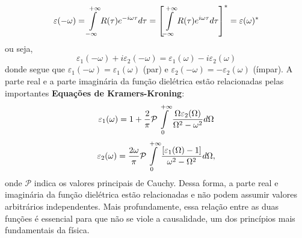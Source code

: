 \documentclass{article}
\begin{document}
\begin{equation}
    \varepsilon(-\omega) = \int\displaylimits_{-\infty}^{+\infty} R(\tau)e^{-i\omega \tau}d\tau = \left[ \int\displaylimits_{-\infty}^{+\infty} R(\tau)e^{i\omega \tau}d\tau \right]^{*} = \varepsilon(\omega)^{*}
\end{equation}
ou seja,
\begin{equation}
    \varepsilon_1(-\omega) + i\varepsilon_2 (-\omega) = \varepsilon_1(\omega) - i\varepsilon_2 (\omega)
\end{equation}
donde segue que $\varepsilon_1(-\omega) = \varepsilon_1(\omega)$ (par) e $\varepsilon_2(-\omega) = -\varepsilon_2(\omega)$ (ímpar). A parte real e a parte imaginária da função dielétrica estão relacionadas pelas importantes \textbf{Equações de Kramers-Kroning}:
\begin{equation}
    \varepsilon_1 (\omega) = 1 + \frac{2}{\pi}\mathcal{P}\int\displaylimits_{0}^{+\infty}\frac{\Omega\varepsilon_2(\Omega)}{\Omega^2 - \omega^2}d\Omega
\end{equation}
\begin{equation}
    \varepsilon_2 (\omega) = \frac{2\omega}{\pi}\mathcal{P}\int\displaylimits_{0}^{+\infty}\frac{[\varepsilon_1(\Omega) - 1]}{\omega^2 - \Omega^2}d\Omega,
\end{equation}
onde $\mathcal{P}$ indica os valores principais de Cauchy. Dessa forma, a parte real e imaginária da função dielétrica estão relacionadas e não podem assumir valores arbitrários independentes. Mais profundamente, essa relação entre as duas funções é essencial para que não se viole a causalidade, um dos princípios mais fundamentais da física.
\end{document}
